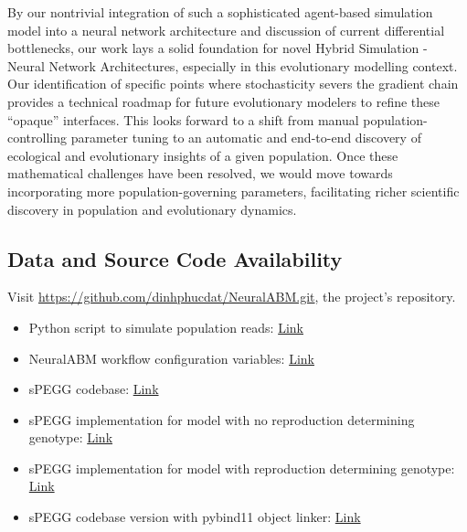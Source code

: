 \documentclass[12pt]{article}
\begin{document}
By our nontrivial integration of such a sophisticated agent-based simulation model into a neural network architecture and discussion of current differential bottlenecks, our work lays a solid foundation for novel Hybrid Simulation - Neural Network Architectures, especially in this evolutionary modelling context. Our identification of specific points where stochasticity severs the gradient chain provides a technical roadmap for future evolutionary modelers to refine these \enquote{opaque} interfaces. This looks forward to a shift from manual population-controlling parameter tuning to an automatic and end-to-end discovery of ecological and evolutionary insights of a given population. Once these mathematical challenges have been resolved, we would move towards incorporating more population-governing parameters, facilitating richer scientific discovery in population and evolutionary dynamics.





\appendixpage
\begin{appendices}
    \section{Data and Source Code Availability} \label{app:code}
    Visit \href{https://github.com/dinhphucdat/NeuralABM.git}{https://github.com/dinhphucdat/NeuralABM.git}, the project's repository.
    \begin{itemize}
        \item Python script to simulate population reads: \href{https://github.com/dinhphucdat/NeuralABM/blob/spegg_neural/models/SpeggGenoDiffABM/ensemble_training/read_simulator/sequence_generator.py}{Link}
        \item NeuralABM workflow configuration variables: \href{https://github.com/dinhphucdat/NeuralABM/blob/spegg_neural/models/SpeggGenoDiffABM/ensemble_training/SPEGGGenDiff_cfg.yml}{Link}
        \item sPEGG codebase: \href{https://github.com/kewok/spegg}{Link}
        \item sPEGG implementation for model with no reproduction determining genotype: \href{https://github.com/dinhphucdat/NeuralABM/tree/spegg_neural/models/SpeggABM/Tutorial_Simulation}{Link}
        \item sPEGG implementation for model with reproduction determining genotype: \href{https://github.com/dinhphucdat/NeuralABM/tree/spegg_neural/models/SpeggGenoDiffABM/GenotypeDiffFecundity}{Link}
        \item sPEGG codebase version with pybind11 object linker: \href{https://github.com/dinhphucdat/spegg/tree/refactor_code/}{Link}
    \end{itemize}
    

\end{appendices}
\end{document}
